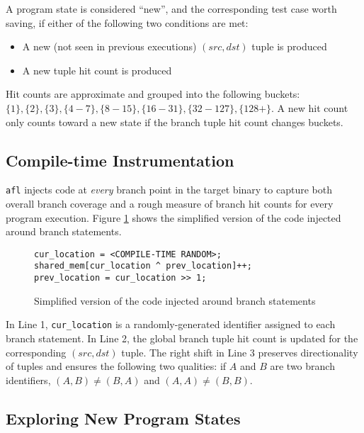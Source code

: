 A program state is considered ``new'', and the corresponding test case
worth saving, if either of the following two conditions are met:
\begin{itemize}
    \item A new (not seen in previous executions) $(src, dst)$ tuple is produced
    \item A new tuple hit count is produced
\end{itemize}

Hit counts are approximate and grouped into the following buckets\cite{afl-whitepaper}: $\{1\}, \{2\}, \{3\}, \{4-7\}, \{8-15\}, \{16-31\}, \{32-127\}, \{128+\}$. A new hit count only counts toward a new state if the branch tuple
hit count changes buckets.

\subsection{Compile-time Instrumentation}

\texttt{afl} injects code at \textit{every} branch point in the target
binary to capture both overall branch coverage and a rough measure of branch 
hit counts for every program execution.
Figure \ref{fig:injection} shows the simplified version of the code
injected around branch statements\cite{afl-whitepaper}. \\

\begin{figure}[H]
    \begin{lstlisting}[language={[ANSI]C}]
cur_location = <COMPILE-TIME RANDOM>;
shared_mem[cur_location ^ prev_location]++;
prev_location = cur_location >> 1;
\end{lstlisting}
\caption{Simplified version of the code injected around branch statements}
\label{fig:injection}
\end{figure}

In Line 1, \texttt{cur\_location} is a randomly-generated identifier
assigned to each branch statement. In Line 2, the global branch tuple hit count
is updated for the corresponding $(src, dst)$ tuple. The right shift in Line 3
preserves directionality of tuples and ensures the following two
qualities: if $A$ and $B$ are two branch identifiers, $(A, B) \neq (B, A)$ and
$(A, A) \neq (B, B)$.

\subsection{Exploring New Program States}

